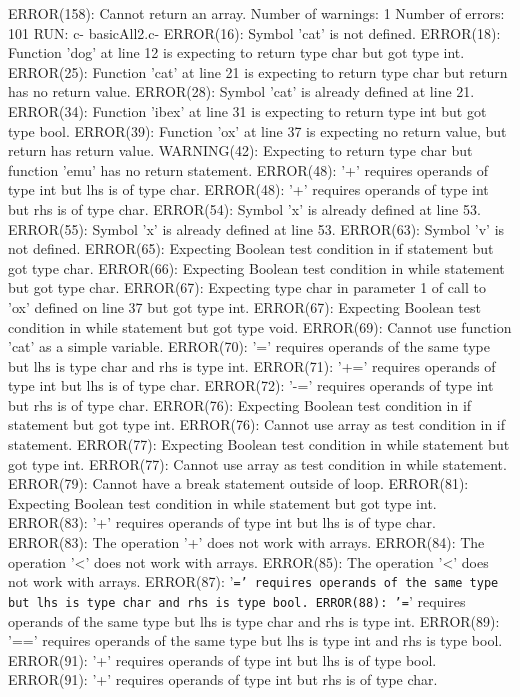 \documentclass[12pt]{book}
\begin{document}
ERROR(158): Cannot return an array.
Number of warnings: 1
Number of errors: 101
RUN: c- basicAll2.c-
ERROR(16): Symbol 'cat' is not defined.
ERROR(18): Function 'dog' at line 12 is expecting to return type char but got type int.
ERROR(25): Function 'cat' at line 21 is expecting to return type char but return has no return value.
ERROR(28): Symbol 'cat' is already defined at line 21.
ERROR(34): Function 'ibex' at line 31 is expecting to return type int but got type bool.
ERROR(39): Function 'ox' at line 37 is expecting no return value, but return has return value.
WARNING(42): Expecting to return type char but function 'emu' has no return statement.
ERROR(48): '+' requires operands of type int but lhs is of type char.
ERROR(48): '+' requires operands of type int but rhs is of type char.
ERROR(54): Symbol 'x' is already defined at line 53.
ERROR(55): Symbol 'x' is already defined at line 53.
ERROR(63): Symbol 'v' is not defined.
ERROR(65): Expecting Boolean test condition in if statement but got type char.
ERROR(66): Expecting Boolean test condition in while statement but got type char.
ERROR(67): Expecting type char in parameter 1 of call to 'ox' defined on line 37 but got type int.
ERROR(67): Expecting Boolean test condition in while statement but got type void.
ERROR(69): Cannot use function 'cat' as a simple variable.
ERROR(70): '=' requires operands of the same type but lhs is type char and rhs is type int.
ERROR(71): '+=' requires operands of type int but lhs is of type char.
ERROR(72): '-=' requires operands of type int but rhs is of type char.
ERROR(76): Expecting Boolean test condition in if statement but got type int.
ERROR(76): Cannot use array as test condition in if statement.
ERROR(77): Expecting Boolean test condition in while statement but got type int.
ERROR(77): Cannot use array as test condition in while statement.
ERROR(79): Cannot have a break statement outside of loop.
ERROR(81): Expecting Boolean test condition in while statement but got type int.
ERROR(83): '+' requires operands of type int but lhs is of type char.
ERROR(83): The operation '+' does not work with arrays.
ERROR(84): The operation '<' does not work with arrays.
ERROR(85): The operation '<' does not work with arrays.
ERROR(87): '\texttt{=' requires operands of the same type but lhs is type char and rhs is type bool.
ERROR(88): '=}' requires operands of the same type but lhs is type char and rhs is type int.
ERROR(89): '==' requires operands of the same type but lhs is type int and rhs is type bool.
ERROR(91): '+' requires operands of type int but lhs is of type bool.
ERROR(91): '+' requires operands of type int but rhs is of type char.
\end{document}
